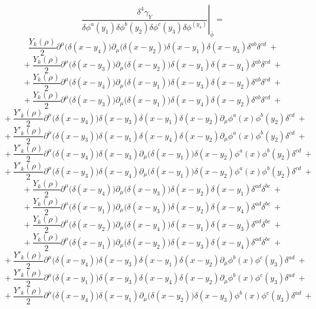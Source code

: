 \begin{equation}
 \left.\frac{\delta^4 \gamma_Y}{\delta\phi^a(y_1)\delta\phi^b(y_2)\delta\phi^c(y_3)\delta\phi^(y_4)}\right|_{\bar{\phi}} = 
\end{equation}
$$ \frac{Y_k(\rho)}{2}\partial^\mu\big(\delta(x - y_4)\big)\partial_\mu\big(\delta(x - y_2)\big)\delta(x - y_1)\delta(x - y_3) \delta^{ab}\delta^{cd}\ +$$
$$+\ \frac{Y_k(\rho)}{2}\partial^\mu\big(\delta(x - y_3)\big)\partial_\mu\big(\delta(x - y_2)\big)\delta(x - y_1)\delta(x - y_4)\delta^{ab}\delta^{cd} \ +$$
$$+\ \frac{Y_k(\rho)}{2}\partial^\mu\big(\delta(x - y_4)\big)\partial_\mu\big(\delta(x - y_1)\big)\delta(x - y_3)\delta(x - y_2)\delta^{ab}\delta^{cd} \ +$$
$$+\ \frac{Y_k(\rho)}{2}\partial^\mu\big(\delta(x - y_3)\big)\partial_\mu\big(\delta(x - y_1)\big)\delta(x - y_4)\delta(x - y_2)\delta^{ab}\delta^{cd} \ +$$
$$+\ \frac{Y'_k(\rho)}{2}\partial^\mu\big(\delta(x - y_4)\big)\delta(x - y_3)\delta(x - y_1)\delta(x - y_2)\partial_\mu\phi^a(x)\phi^b(y_2)\delta^{cd} \ +$$
$$+\ \frac{Y'_k(\rho)}{2}\partial^\mu\big(\delta(x - y_3)\big)\delta(x - y_1)\delta(x - y_4)\delta(x - y_2)\partial_\mu\phi^a(x)\phi^b(y_2)\delta^{cd} \ +$$
$$+\ \frac{Y'_k(\rho)}{2}\partial^\mu\big(\delta(x - y_4)\big)\delta(x - y_3)\partial_\mu\big(\delta(x - y_1)\big)\delta(x - y_2)\phi^a(x)\phi^b(y_2)\delta^{cd} \ +$$
$$+\ \frac{Y'_k(\rho)}{2}\partial^\mu\big(\delta(x - y_3)\big)\delta(x - y_4)\partial_\mu\big(\delta(x - y_1)\big)\delta(x - y_2)\phi^a(x)\phi^b(y_2)\delta^{cd} \ +$$
$$+\ \frac{Y_k(\rho)}{2}\partial^\mu\big(\delta(x - y_4)\big)\partial_\mu\big(\delta(x - y_3)\big)\delta(x - y_2)\delta(x - y_1) \delta^{ad}\delta^{bc}\ +$$
$$+\ \frac{Y_k(\rho)}{2}\partial^\mu\big(\delta(x - y_1)\big)\partial_\mu\big(\delta(x - y_3)\big)\delta(x - y_2)\delta(x - y_4) \delta^{ad}\delta^{bc}\ +$$
$$+\ \frac{Y_k(\rho)}{2}\partial^\mu\big(\delta(x - y_2)\big)\partial_\mu\big(\delta(x - y_4)\big)\delta(x - y_1)\delta(x - y_3) \delta^{ad}\delta^{bc}\ +$$
$$+\ \frac{Y_k(\rho)}{2}\partial^\mu\big(\delta(x - y_1)\big)\partial_\mu\big(\delta(x - y_2)\big)\delta(x - y_3)\delta(x - y_4) \delta^{ad}\delta^{bc}\ +$$
$$+\ \frac{Y'_k(\rho)}{2}\partial^\mu\big(\delta(x - y_4)\big)\delta(x - y_3)\delta(x - y_1)\delta(x - y_2)\partial_\mu\phi^b(x)\phi^c(y_3)\delta^{ad} \ +$$
$$+\ \frac{Y'_k(\rho)}{2}\partial^\mu\big(\delta(x - y_1)\big)\delta(x - y_3)\delta(x - y_4)\delta(x - y_2)\partial_\mu\phi^b(x)\phi^c(y_3)\delta^{ad} \ +$$
$$+\ \frac{Y'_k(\rho)}{2}\partial^\mu\big(\delta(x - y_4)\big)\delta(x - y_1)\partial_\mu\big(\delta(x - y_2)\big)\delta(x - y_3)\phi^b(x)\phi^c(y_3)\delta^{ad} \ +$$
